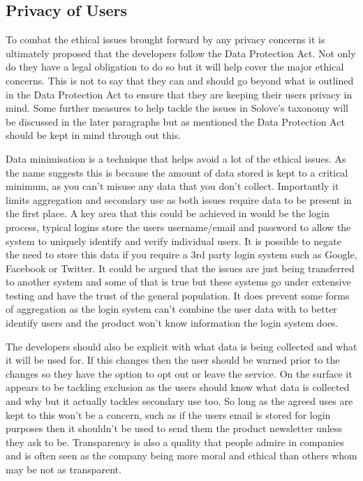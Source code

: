 \documentclass[a4paper]{article}
\begin{document}
\subsection{Privacy of Users}
To combat the ethical issues brought forward by any privacy concerns it is ultimately proposed that the developers follow the Data Protection Act.
Not only do they have a legal obligation to do so but it will help cover the major ethical concerns.
This is not to say that they can and should go beyond what is outlined in the Data Protection Act to ensure that they are keeping their users privacy in mind.
Some further measures to help tackle the issues in Solove's taxonomy will be discussed in the later paragraphs but as mentioned the Data Protection Act should be kept in mind through out this.
\\ \par
Data minimisation is a technique that helps avoid a lot of the ethical issues.
As the name suggests this is because the amount of data stored is kept to a critical minimum, as you can't misuse any data that you don't collect.
Importantly it limits aggregation and secondary use as both issues require data to be present in the first place.
A key area that this could be achieved in would be the login process, typical logins store the users username/email and password to allow the system to uniquely identify and verify individual users.
It is possible to negate the need to store this data if you require a 3rd party login system such as Google, Facebook or Twitter.
It could be argued that the issues are just being transferred to another system and some of that is true but these systems go under extensive testing and have the trust of the general population.
It does prevent some forms of aggregation as the login system can't combine the user data with to better identify users and the product won't know information the login system does.
\par
The developers should also be explicit with what data is being collected and what it will be used for.
If this changes then the user should be warned prior to the changes so they have the option to opt out or leave the service.
On the surface it appears to be tackling exclusion as the users should know what data is collected and why but it actually tackles secondary use too.
So long as the agreed uses are kept to this won't be a concern, such as if the users email is stored for login purposes then it shouldn't be used to send them the product newsletter unless they ask to be.
Transparency is also a quality that people admire in companies and is often seen as the company being more moral and ethical than others whom may be not as transparent.
\end{document}
